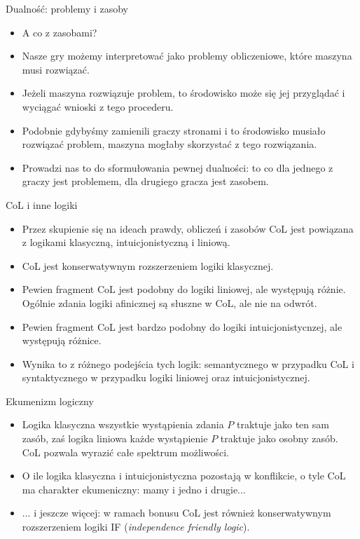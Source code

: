 \documentclass{beamer}
\begin{document}
\begin{frame}{Dualność: problemy i zasoby}
\begin{itemize}
	\item A co z zasobami?
	\item Nasze gry możemy interpretować jako problemy obliczeniowe, które maszyna musi rozwiązać.
	\item Jeżeli maszyna rozwiązuje problem, to środowisko może się jej przyglądać i wyciągać wnioski z tego procederu.
	\item Podobnie gdybyśmy zamienili graczy stronami i to środowisko musiało rozwiązać problem, maszyna mogłaby skorzystać z tego rozwiązania.
	\item Prowadzi nas to do sformułowania pewnej dualności: to co dla jednego z graczy jest problemem, dla drugiego gracza jest zasobem.
\end{itemize}
\end{frame}

\begin{frame}{CoL i inne logiki}
\begin{itemize}
	\item Przez skupienie się na ideach prawdy, obliczeń i zasobów CoL jest powiązana z logikami klasyczną, intuicjonistyczną i liniową.
	\item CoL jest konserwatywnym rozszerzeniem logiki klasycznej.
	\item Pewien fragment CoL jest podobny do logiki liniowej, ale występują różnie. Ogólnie zdania logiki afinicznej są słuszne w CoL, ale nie na odwrót.
	\item Pewien fragment CoL jest bardzo podobny do logiki intuicjonistycnzej, ale występują różnice.
	\item Wynika to z różnego podejścia tych logik: semantycznego w przypadku CoL i syntaktycznego w przypadku logiki liniowej oraz intuicjonistycznej.
\end{itemize}
\end{frame}

\begin{frame}{Ekumenizm logiczny}
\begin{itemize}
	\item Logika klasyczna wszystkie wystąpienia zdania $P$ traktuje jako ten sam zasób, zaś logika liniowa każde wystąpienie $P$ traktuje jako osobny zasób. CoL pozwala wyrazić całe spektrum możliwości.
	\item O ile logika klasyczna i intuicjonistyczna pozostają w konflikcie, o tyle CoL ma charakter ekumeniczny: mamy i jedno i drugie...
	\item ... i jeszcze więcej: w ramach bonusu CoL jest również konserwatywnym rozszerzeniem logiki IF (\textit{independence friendly logic}).
\end{itemize}
\end{frame}
\end{document}

